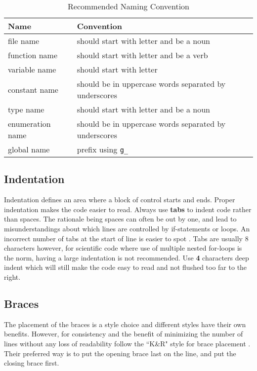 \documentclass[11pt]{article}
\begin{document}
\begin{table}[h]
	\caption{Recommended Naming Convention}
	\label{tbl:naming_convention}
	\begin{tabular}{|l|l|}\hline
		Name             &Convention\\ \hline
		file name        &should start with letter and be a noun\\ \hline
		function name    &should start with letter and be a verb\\ \hline
		variable name    &should start with letter\\ \hline
		constant name    &should be in uppercase words separated by underscores\\ \hline
		type name        &should start with letter and be a noun\\ \hline
		enumeration name &should be in uppercase words separated by underscores\\ \hline
		global name      &prefix using \texttt{g\_}\\ \hline
	\end{tabular}
\end{table}

\subsection{Indentation}
Indentation defines an area where a block of control starts and ends. Proper indentation makes the code easier to read. Always use \textbf{tabs} to indent code rather than spaces. The rationale being spaces can often be out by one, and lead to misunderstandings about which lines are controlled by if-statements or loops. An incorrect number of tabs at the start of line is easier to spot \cite{c_style}. Tabs are usually 8 characters however, for scientific code where use of multiple nested for-loops is the norm, having a large indentation is not recommended. Use \textbf{4} characters deep indent which will still make the code easy to read and not flushed too far to the right.

\subsection{Braces}
The placement of the braces is a style choice and different styles have their own benefits. However, for consistency and the benefit of minimizing the number of lines without any loss of readability follow the ``K\&R" style for brace placement \cite{c_style}. Their preferred way is to put the opening brace last on the line, and put the closing brace first.
\end{document}
